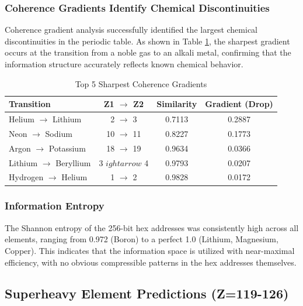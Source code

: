\documentclass[12pt, a4paper]{article}
\begin{document}
\subsubsection{Coherence Gradients Identify Chemical Discontinuities}

Coherence gradient analysis successfully identified the largest chemical discontinuities in the periodic table. As shown in Table \ref{tab:gradients}, the sharpest gradient occurs at the transition from a noble gas to an alkali metal, confirming that the information structure accurately reflects known chemical behavior.

\begin{table}[H]
    \centering
    \captionsetup{justification=centering}
    \caption{Top 5 Sharpest Coherence Gradients}
    \label{tab:gradients}
    \begin{tabular}{lccc}
        \toprule
        \textbf{Transition} & \textbf{Z1 $\rightarrow$ Z2} & \textbf{Similarity} & \textbf{Gradient (Drop)} \\
        \midrule
        Helium $\rightarrow$ Lithium & 2 $\rightarrow$ 3 & 0.7113 & 0.2887 \\
        Neon $\rightarrow$ Sodium & 10 $\rightarrow$ 11 & 0.8227 & 0.1773 \\
        Argon $\rightarrow$ Potassium & 18 $\rightarrow$ 19 & 0.9634 & 0.0366 \\
        Lithium $\rightarrow$ Beryllium & 3 $
ightarrow$ 4 & 0.9793 & 0.0207 \\
        Hydrogen $\rightarrow$ Helium & 1 $\rightarrow$ 2 & 0.9828 & 0.0172 \\
        \bottomrule
    \end{tabular}
\end{table}

\subsubsection{Information Entropy}

The Shannon entropy of the 256-bit hex addresses was consistently high across all elements, ranging from 0.972 (Boron) to a perfect 1.0 (Lithium, Magnesium, Copper). This indicates that the information space is utilized with near-maximal efficiency, with no obvious compressible patterns in the hex addresses themselves.

\subsection{Superheavy Element Predictions (Z=119-126)}
\end{document}
